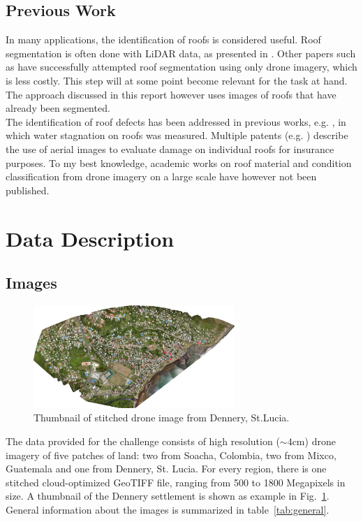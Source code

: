 \documentclass[11pt]{article}
\begin{document}
	\subsection{Previous Work}
	
	In many applications, the identification of roofs is considered useful. Roof segmentation is often done with LiDAR data, as presented in \cite{Chen2012}. Other papers such as \cite{Soman2019} have successfully attempted roof segmentation using only drone imagery, which is less costly. This step will at some point become relevant for the task at hand. The approach discussed in this report however uses images of roofs that have already been segmented.\\
	
	The identification of roof defects has been addressed in previous works, e.g. \cite{Yudin2018}, in which water stagnation on roofs was measured. Multiple patents (e.g. \cite{Shreve2017}) describe the use of aerial images to evaluate damage on individual roofs for insurance purposes. To my best knowledge, academic works on roof material and condition classification from drone imagery on a large scale have however not been published. 
	
	\section{Data Description}
	
	\subsection{Images}
		
	\begin{figure}
		\centering		
		\includegraphics[width=0.68\textwidth]{figures/thumbnail_dennery.png}
		\caption{Thumbnail of stitched drone image from Dennery, St.Lucia.}
		\label{fig:thumbnail_dennery}
	\end{figure}

	The data provided for the challenge consists of high resolution ($\sim4$cm) drone imagery of five patches of land: two from Soacha, Colombia, two from Mixco, Guatemala and one from Dennery, St. Lucia.
	For every region, there is one stitched cloud-optimized GeoTIFF file, ranging from 500 to 1800 Megapixels in size. A thumbnail of the Dennery settlement is shown as example in Fig.~\ref{fig:thumbnail_dennery}.\\
	General information about the images is summarized in table~\ref{tab:general}.
\end{document}
